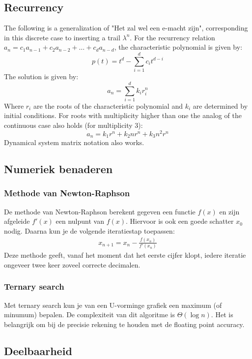 \documentclass[10pt,hidelinks]{article}
\begin{document}
\subsection{Recurrency}
The following is a generalization of "Het zal wel een e-macht zijn", corresponding in this discrete case to inserting a trail $\lambda^n$.
For the recurrency relation $a_n = c_1a_{n-1} + c_2a_{n-2} + \dots + c_da_{n-d}$, the characteristic polynomial is given by:
\[p(t) = t^d - \sum_{i=1}^d c_it^{d-i}\]
The solution is given by:
\[a_n = \sum_{i=1}^d k_ir_i^n\]
Where $r_i$ are the roots of the characteristic polynomial and $k_i$ are determined by initial conditions. For roots with multiplicity higher than one the analog of the continuous case also holds (for multiplicity 3):
\[a_n = k_1r^n+k_2nr^n+k_3n^2r^n\]
Dynamical system matrix notation also works.

\subsection{Numeriek benaderen}

\subsubsection{Methode van Newton-Raphson}

De methode van Newton-Raphson berekent gegeven een functie $f(x)$ en zijn afgeleide $f'(x)$ een nulpunt van $f(x)$. Hiervoor is ook een goede schatter $x_0$ nodig. Daarna kun je de volgende iteratiestap toepassen:
\begin{align*}
    x_{n+1} = x_{n} - \frac{f(x_{n})}{f'(x_{n})}
\end{align*}
Deze methode geeft, vanaf het moment dat het eerste cijfer klopt, iedere iteratie ongeveer twee keer zoveel correcte decimalen.

\subsubsection{Ternary search}

Met ternary search kun je van een U-vorminge grafiek een maximum (of minumum) bepalen. De complexiteit van dit algoritme is $\Theta(\log n)$. Het is belangrijk om bij de precisie rekening te houden met de floating point accuracy.



\subsection{Deelbaarheid}
\end{document}
